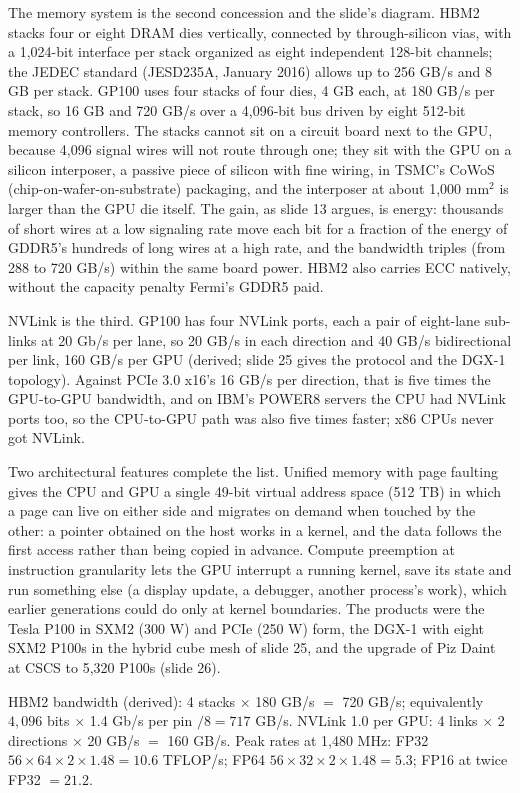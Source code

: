 \documentclass[11pt,letterpaper]{article}
\newenvironment{formulas}{\begin{tcolorbox}[formulabox]}{\end{tcolorbox}}
\begin{document}
The memory system is the second concession and the slide's diagram. HBM2 stacks four or eight DRAM dies vertically, connected by through-silicon vias, with a 1,024-bit interface per stack organized as eight independent 128-bit channels; the JEDEC standard (JESD235A, January 2016) allows up to 256 GB/s and 8 GB per stack. GP100 uses four stacks of four dies, 4 GB each, at 180 GB/s per stack, so 16 GB and 720 GB/s over a 4,096-bit bus driven by eight 512-bit memory controllers. The stacks cannot sit on a circuit board next to the GPU, because 4,096 signal wires will not route through one; they sit with the GPU on a silicon interposer, a passive piece of silicon with fine wiring, in TSMC's CoWoS (chip-on-wafer-on-substrate) packaging, and the interposer at about 1,000 mm$^2$ is larger than the GPU die itself. The gain, as slide 13 argues, is energy: thousands of short wires at a low signaling rate move each bit for a fraction of the energy of GDDR5's hundreds of long wires at a high rate, and the bandwidth triples (from 288 to 720 GB/s) within the same board power. HBM2 also carries ECC natively, without the capacity penalty Fermi's GDDR5 paid.

NVLink is the third. GP100 has four NVLink ports, each a pair of eight-lane sub-links at 20 Gb/s per lane, so 20 GB/s in each direction and 40 GB/s bidirectional per link, 160 GB/s per GPU (derived; slide 25 gives the protocol and the DGX-1 topology). Against PCIe 3.0 x16's 16 GB/s per direction, that is five times the GPU-to-GPU bandwidth, and on IBM's POWER8 servers the CPU had NVLink ports too, so the CPU-to-GPU path was also five times faster; x86 CPUs never got NVLink.

Two architectural features complete the list. Unified memory with page faulting gives the CPU and GPU a single 49-bit virtual address space (512 TB) in which a page can live on either side and migrates on demand when touched by the other: a pointer obtained on the host works in a kernel, and the data follows the first access rather than being copied in advance. Compute preemption at instruction granularity lets the GPU interrupt a running kernel, save its state and run something else (a display update, a debugger, another process's work), which earlier generations could do only at kernel boundaries. The products were the Tesla P100 in SXM2 (300 W) and PCIe (250 W) form, the DGX-1 with eight SXM2 P100s in the hybrid cube mesh of slide 25, and the upgrade of Piz Daint at CSCS to 5,320 P100s (slide 26).

\begin{formulas}
HBM2 bandwidth (derived): 4 stacks $\times$ 180 GB/s $=$ 720 GB/s; equivalently $4{,}096$ bits $\times$ 1.4 Gb/s per pin $/ 8 = 717$ GB/s. NVLink 1.0 per GPU: 4 links $\times$ 2 directions $\times$ 20 GB/s $=$ 160 GB/s. Peak rates at 1,480 MHz: FP32 $56\times64\times2\times1.48 = 10.6$ TFLOP/s; FP64 $56\times32\times2\times1.48 = 5.3$; FP16 at twice FP32 $= 21.2$.
\end{formulas}
\end{document}

